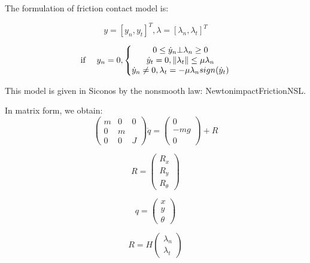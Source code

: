 The formulation of friction contact model is:

\begin{equation}
y=[y_n,y_t]^T,\lambda=[\lambda_n,\lambda_t]^T
\end{equation}

\begin{equation}
\text{if \quad}  y_n=0, \left\{ \begin{matrix} 
0\le \dot{y}_n \bot \lambda_n \ge 0 \\
\dot{y}_t=0,\|\lambda_t \| \le \mu \lambda_n\\
\dot{y}_n \neq0, \lambda_t=-\mu \lambda_n sign(\dot{y}_t)
\end{matrix} \right.
\end{equation}

This model is given in Siconos by the nonsmooth law: NewtonimpactFrictionNSL. 

In matrix form, we obtain:
\begin{equation}
\begin{pmatrix} m & 0 & 0 \\
0 & m & \\
0 & 0 & J \end{pmatrix}
\ddot{q}= \begin{pmatrix}
0 \\ -mg \\ 0 
\end{pmatrix}+R
\end{equation}

\begin{equation}
R=\begin{pmatrix}
R_x \\ R_y \\ R_{\theta}
\end{pmatrix}
\end{equation}

\begin{equation}
q=\begin{pmatrix} x \\y \\ \theta \end{pmatrix}
\end{equation}

\begin{equation}
R=H\begin{pmatrix}
\lambda_n
\\ \lambda_t \end{pmatrix}
\end{equation}


